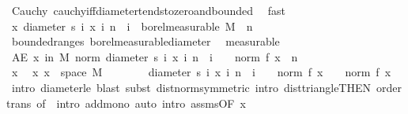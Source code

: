 \begin{isabellebody}
\ Cauchy\ cauchy{\isacharunderscore}{\kern0pt}iff{\isacharunderscore}{\kern0pt}diameter{\isacharunderscore}{\kern0pt}tends{\isacharunderscore}{\kern0pt}to{\isacharunderscore}{\kern0pt}zero{\isacharunderscore}{\kern0pt}and{\isacharunderscore}{\kern0pt}bounded\ \isamarkupfalse%
\ fast\isanewline
\ \ \isamarkupfalse%
\ \isamarkupfalse%
\ {\isachardoublequoteopen}{\isacharparenleft}{\kern0pt}{\isasymlambda}x{\isachardot}{\kern0pt}\ diameter\ {\isacharbraceleft}{\kern0pt}s\ i\ x\ {\isacharbar}{\kern0pt}i{\isachardot}{\kern0pt}\ n\ {\isasymle}\ i{\isacharbraceright}{\kern0pt}{\isacharparenright}{\kern0pt}\ {\isasymin}\ borel{\isacharunderscore}{\kern0pt}measurable\ M{\isachardoublequoteclose}\ \ n\ \isamarkupfalse%
\ bounded{\isacharunderscore}{\kern0pt}range{\isacharunderscore}{\kern0pt}s\ borel{\isacharunderscore}{\kern0pt}measurable{\isacharunderscore}{\kern0pt}diameter\ \isamarkupfalse%
\ measurable\isanewline
\ \ \isamarkupfalse%
\ \isamarkupfalse%
\ {\isachardoublequoteopen}AE\ x\ in\ M{\isachardot}{\kern0pt}\ norm\ {\isacharparenleft}{\kern0pt}diameter\ {\isacharbraceleft}{\kern0pt}s\ i\ x\ {\isacharbar}{\kern0pt}i{\isachardot}{\kern0pt}\ n\ {\isasymle}\ i{\isacharbraceright}{\kern0pt}{\isacharparenright}{\kern0pt}\ {\isasymle}\ {}\ {\isacharasterisk}{\kern0pt}\ norm\ {\isacharparenleft}{\kern0pt}f\ x{\isacharparenright}{\kern0pt}{\isachardoublequoteclose}\ \ n\isanewline
\ \ \isamarkupfalse%
\ {\isacharminus}{\kern0pt}\ \isanewline
\ \ \ \ \isacommand{{\isacharbraceleft}{\kern0pt}}\isamarkupfalse%
\isanewline
\ \ \ \ \ \ \isamarkupfalse%
\ x\ \isamarkupfalse%
\ x{\isacharcolon}{\kern0pt}\ {\isachardoublequoteopen}x\ {\isasymin}\ space\ M{\isachardoublequoteclose}\isanewline
\ \ \ \ \ \ \isamarkupfalse%
\ {\isachardoublequoteopen}diameter\ {\isacharbraceleft}{\kern0pt}s\ i\ x\ {\isacharbar}{\kern0pt}i{\isachardot}{\kern0pt}\ n\ {\isasymle}\ i{\isacharbraceright}{\kern0pt}\ {\isasymle}\ {}\ {\isacharasterisk}{\kern0pt}\ norm\ {\isacharparenleft}{\kern0pt}f\ x{\isacharparenright}{\kern0pt}\ {\isacharplus}{\kern0pt}\ {}\ {\isacharasterisk}{\kern0pt}\ norm\ {\isacharparenleft}{\kern0pt}f\ x{\isacharparenright}{\kern0pt}{\isachardoublequoteclose}\ \isamarkupfalse%
\ {\isacharparenleft}{\kern0pt}intro\ diameter{\isacharunderscore}{\kern0pt}le{\isacharcomma}{\kern0pt}\ blast{\isacharcomma}{\kern0pt}\ subst\ dist{\isacharunderscore}{\kern0pt}norm{\isacharbrackleft}{\kern0pt}symmetric{\isacharbrackright}{\kern0pt}{\isacharcomma}{\kern0pt}\ intro\ dist{\isacharunderscore}{\kern0pt}triangle{}{\isacharbrackleft}{\kern0pt}THEN\ order{\isacharunderscore}{\kern0pt}trans{\isacharcomma}{\kern0pt}\ of\ {}{\isacharbrackright}{\kern0pt}{\isacharcomma}{\kern0pt}\ intro\ add{\isacharunderscore}{\kern0pt}mono{\isacharparenright}{\kern0pt}\ {\isacharparenleft}{\kern0pt}auto\ intro{\isacharcolon}{\kern0pt}\ assms{\isacharparenleft}{\kern0pt}{}{\isacharparenright}{\kern0pt}{\isacharbrackleft}{\kern0pt}OF\ x{\isacharbrackright}{\kern0pt}{\isacharparenright}{\kern0pt}\isanewline

\end{isabellebody}
